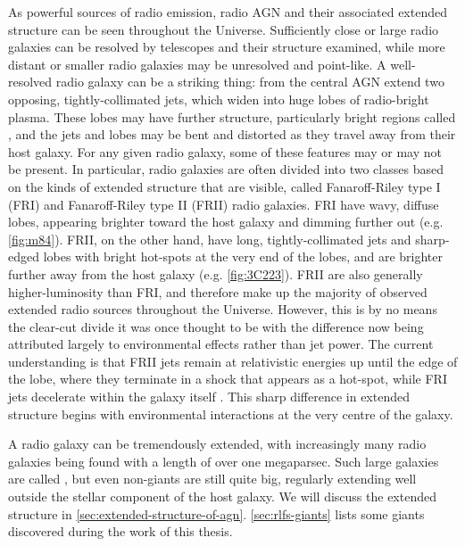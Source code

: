         As powerful sources of radio emission, radio AGN and their associated extended structure can be seen throughout the Universe. Sufficiently close or large radio galaxies can be resolved by telescopes and their structure examined, while more distant or smaller radio galaxies may be unresolved and point-like. A well-resolved radio galaxy can be a striking thing: from the central AGN extend two opposing, tightly-collimated jets, which widen into huge lobes of radio-bright plasma. These lobes may have further structure, particularly bright regions called , and the jets and lobes may be bent and distorted as they travel away from their host galaxy. For any given radio galaxy, some of these features may or may not be present. In particular, radio galaxies are often divided into two classes based on the kinds of extended structure that are visible, called Fanaroff-Riley type I (FRI) and Fanaroff-Riley type II (FRII) radio galaxies. FRI have wavy, diffuse lobes, appearing brighter toward the host galaxy and dimming further out (e.g. \autoref{fig:m84}). FRII, on the other hand, have long, tightly-collimated jets and sharp-edged lobes with bright hot-spots \citep{urry_unified_1995} at the very end of the lobes, and are brighter further away from the host galaxy (e.g. \autoref{fig:3C223}). FRII are also generally higher-luminosity \citep{fanaroff1974} than FRI, and therefore make up the majority of observed extended radio sources throughout the Universe. However, this is by no means the clear-cut divide it was once thought to be \citep{mingo_revisiting_2019} with the difference now being attributed largely to environmental effects rather than jet power. The current understanding is that FRII jets remain at relativistic energies up until the edge of the lobe, where they terminate in a shock that appears as a hot-spot, while FRI jets decelerate within the galaxy itself \citep{hardcastle_radio_2020}. This sharp difference in extended structure begins with environmental interactions at the very centre of the galaxy.

        A radio galaxy can be tremendously extended, with increasingly many radio galaxies being found with a length of over one megaparsec. Such large galaxies are called , but even non-giants are still quite big, regularly extending well outside the stellar component of the host galaxy. We will discuss the extended structure in \autoref{sec:extended-structure-of-agn}. \autoref{sec:rlfs-giants} lists some giants discovered during the work of this thesis.

